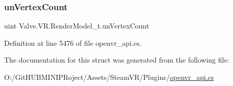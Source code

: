 \mbox{\label{struct_valve_1_1_v_r_1_1_render_model__t_a11ba36b952be53e24ea7e8f45c9a61dc}} 
\subsubsection{\texorpdfstring{unVertexCount}{unVertexCount}}
{\footnotesize\ttfamily uint Valve.\+V\+R.\+Render\+Model\+\_\+t.\+un\+Vertex\+Count}



Definition at line 5476 of file openvr\+\_\+api.\+cs.



The documentation for this struct was generated from the following file\+:\begin{DoxyCompactItemize}
\item 
O\+:/\+Git\+H\+U\+B\+M\+I\+N\+I\+P\+Roject/\+Assets/\+Steam\+V\+R/\+Plugins/\mbox{\hyperlink{openvr__api_8cs}{openvr\+\_\+api.\+cs}}\end{DoxyCompactItemize}
